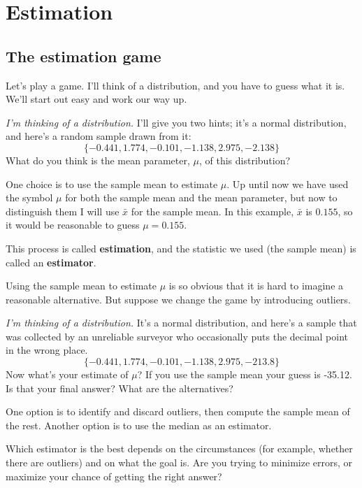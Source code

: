 \documentclass[12pt]{book}
\begin{document}
\chapter{Estimation}
\label{estimation}

\section{The estimation game}

Let's play a game.  I'll think of a distribution, and you have to guess
what it is.  We'll start out easy and work our way up.

{\em I'm thinking of a distribution.}  I'll give you two hints; it's a
normal distribution, and here's a random sample drawn from it:
%
\[ \{ -0.441, 1.774, -0.101, -1.138, 2.975, -2.138 \} \]
%
What do you think is the mean parameter, $\mu$, of this distribution?

\newcommand{\xbar}{\bar{x}}
\newcommand{\ybar}{\bar{y}}

One choice is to use the sample mean to estimate $\mu$.  Up
until now we have used the symbol $\mu$ for both the sample mean and
the mean parameter, but now to distinguish them I will use $\xbar$
for the sample mean.  In this example, $\xbar$ is $0.155$, so it would
be reasonable to guess $\mu = 0.155$.

This process is called {\bf estimation}, and the statistic we used
(the sample mean) is called an {\bf estimator}.

Using the sample mean to estimate $\mu$ is so obvious that it is hard
to imagine a reasonable alternative.  But suppose we change the game by
introducing outliers.  

{\em I'm thinking of a distribution.}  It's a normal distribution, and
here's a sample that was collected by an unreliable surveyor who
occasionally puts the decimal point in the wrong place.
%
\[ \{ -0.441, 1.774, -0.101, -1.138, 2.975, -213.8 \} \]
%
Now what's your estimate of $\mu$?  If you use the sample mean your
guess is -35.12.  Is that your final answer?  What are the alternatives?

One option is to identify and discard outliers, then compute the sample
mean of the rest.  Another option is to use the median as an estimator.

Which estimator is the best depends on the circumstances (for example,
whether there are outliers) and on what the goal is.  Are you
trying to minimize errors, or maximize your chance of getting the
right answer?
\end{document}
